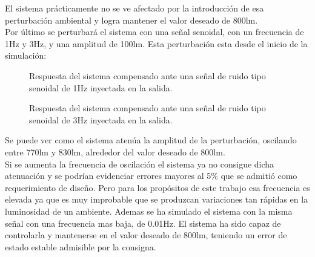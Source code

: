 \documentclass[a4paper,11pt]{article}
\begin{document}
El sistema prácticamente no se ve afectado por la introducción de esa perturbación ambiental y logra mantener el valor deseado de 800lm.\\
Por último se perturbará el sistema con una señal senoidal, con un frecuencia de 1Hz y 3Hz, y una amplitud de 100lm. Esta perturbación esta desde el inicio de la simulación:\\

	  \begin{figure}[H] %
	\caption{Respuesta del sistema compensado ante una señal de ruido tipo senoidal de 1Hz inyectada en la salida.}
	\label{fig:FTlazoc_comp_step+pert_sin1hz}
	\end{figure}

 \begin{figure}[H] %
	\caption{Respuesta del sistema compensado ante una señal de ruido tipo senoidal de 3Hz inyectada en la salida.}
	\label{fig:FTlazoc_comp_step+pert_sin3hz}
\end{figure}
	
Se puede ver como el sistema atenúa la amplitud de la perturbación, oscilando entre 770lm y 830lm, alrededor del valor deseado de 800lm.\\
Si se aumenta la frecuencia de oscilación el sistema ya no consigue dicha atenuación y se podrían evidenciar errores mayores al 5\% que se admitió como requerimiento de diseño. Pero para los propósitos de este trabajo esa frecuencia es elevada ya que es muy improbable que se produzcan variaciones tan rápidas en la luminosidad de un ambiente.
Ademas se ha simulado el sistema con la misma señal con una frecuencia mas baja, de 0.01Hz. El sistema ha sido capaz de controlarla y mantenerse en el valor deseado de 800lm, teniendo un error de estado estable admisible por la consigna.\\
\end{document}
